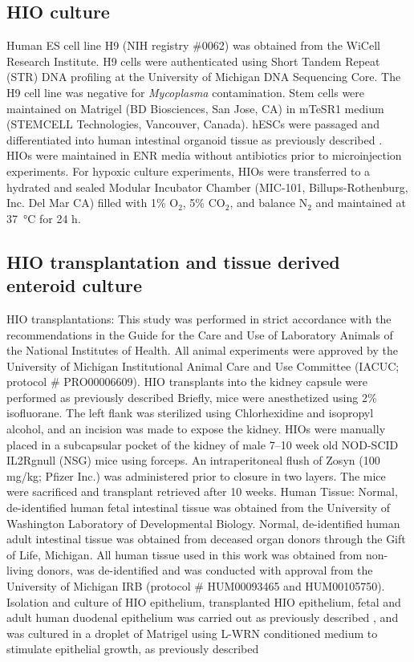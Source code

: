 \documentclass[9pt,lineo]{elife}
\begin{document}
\subsection*{{\bfseries\sffamily } HIO culture}
\label{sec:orgheadline14}
Human ES cell line H9 (NIH registry \#0062) was obtained from the WiCell Research Institute. H9 cells were authenticated using Short Tandem Repeat (STR) DNA profiling \citep{Matsuo:1999} at the University of Michigan DNA Sequencing Core. The H9 cell line was negative for \emph{Mycoplasma} contamination. Stem cells were maintained on Matrigel (BD Biosciences, San Jose, CA) in mTeSR1 medium (STEMCELL Technologies, Vancouver, Canada). hESCs were passaged and differentiated into human intestinal organoid tissue as previously described \citep{Spence:2011,McCracken:2011}. HIOs were maintained in ENR media without antibiotics prior to microinjection experiments.
For hypoxic culture experiments, HIOs were transferred to a hydrated and sealed Modular Incubator Chamber (MIC-101, Billups-Rothenburg, Inc. Del Mar CA) filled with 1\% O\(_{\text{2}}\), 5\% CO\(_{\text{2}}\), and balance N\(_{\text{2}}\) and maintained at \SI{37}{\celsius} for 24 h.
\subsection*{{\bfseries\sffamily } HIO transplantation and tissue derived enteroid culture}
\label{sec:orgheadline15}
HIO transplantations: This study was performed in strict accordance with the recommendations in the Guide for the Care and Use of Laboratory Animals of the National Institutes of Health. All animal experiments were approved by the University of Michigan Institutional Animal Care and Use Committee (IACUC; protocol \# PRO00006609). HIO transplants into the kidney capsule were performed as previously described \citep{Finkbeiner:2015,Dye:2016} Briefly, mice were anesthetized using 2\% isofluorane. The left flank was sterilized using Chlorhexidine and isopropyl alcohol, and an incision was made to expose the kidney. HIOs were manually placed in a subcapsular pocket of the kidney of male 7–10 week old NOD-SCID IL2Rgnull (NSG) mice using forceps. An intraperitoneal flush of Zosyn (100 mg/kg; Pfizer Inc.) was administered prior to closure in two layers. The mice were sacrificed and transplant retrieved after 10 weeks. 
Human Tissue: Normal, de-identified human fetal intestinal tissue was obtained from the University of Washington Laboratory of Developmental Biology. Normal, de-identified human adult intestinal tissue was obtained from deceased organ donors through the Gift of Life, Michigan. All human tissue used in this work was obtained from non-living donors, was de-identified and was conducted with approval from the University of Michigan IRB (protocol \# HUM00093465 and HUM00105750).  Isolation and culture of HIO epithelium, transplanted HIO epithelium, fetal and adult human duodenal epithelium was carried out as previously described \citep{Finkbeiner:2015}, and was cultured in a droplet of Matrigel using L-WRN conditioned medium to stimulate epithelial growth, as previously described \citep{Miyoshi:2012,Miyoshi:2013}
\end{document}
